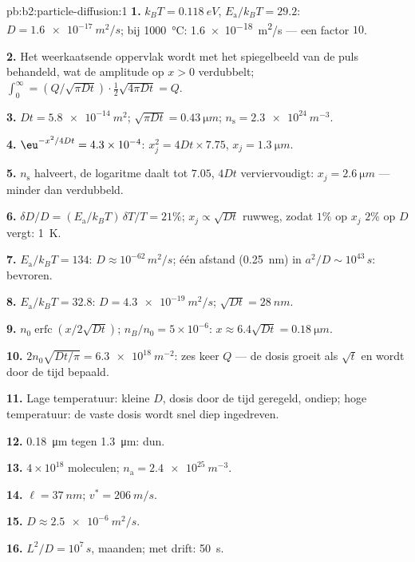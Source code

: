 \begin{solution}{pb:b2:particle-diffusion:1}
\textbf{1.} $k_BT = \qty{0.118}{eV}$, $E_{\text{a}}/k_BT = 29.2$:
$D =
\qty{1.6e-17}{m^2/s}$; bij \qty{1000}{\celsius}: \qty{1.6e-18}{m^2/s}
--- een
factor $10$.

\textbf{2.} Het weerkaatsende oppervlak wordt met het spiegelbeeld van de
puls behandeld, wat de amplitude op $x > 0$ verdubbelt;
$\int_0^\infty = (Q/\sqrt{\pi Dt})
\cdot \tfrac12\sqrt{4\pi Dt} = Q$.

\textbf{3.} $Dt = \qty{5.8e-14}{m^2}$;
$\sqrt{\pi Dt} = \qty{0.43}{\micro m}$;
$n_{\text{s}}
= \qty{2.3e24}{m^{-3}}$.

\textbf{4.} $\eu^{-x^2/4Dt} = 4.3 \times 10^{-4}$:
$x_j^2 = 4Dt \times 7.75$, $x_j =
\qty{1.3}{\micro m}$.

\textbf{5.} $n_{\text{s}}$ halveert, de logaritme daalt tot $7.05$, $4Dt$
verviervoudigt: $x_j = \qty{2.6}{\micro m}$ --- minder dan verdubbeld.

\textbf{6.} $\delta D/D = (E_{\text{a}}/k_BT)\,\delta T/T = 21\%$;
$x_j \propto
\sqrt{Dt}$ ruwweg, zodat $1\%$ op $x_j$ $2\%$ op $D$ vergt:
\qty{1}{K}.

\textbf{7.} $E_{\text{a}}/k_BT = 134$: $D \approx 10^{-62}\,\unit{m^2/s}$; één
afstand (\qty{0.25}{nm}) in $a^2/D \sim 10^{43}\,\unit{s}$: bevroren.

\textbf{8.} $E_{\text{a}}/k_BT = 32.8$: $D = \qty{4.3e-19}{m^2/s}$;
$\sqrt{Dt} =
\qty{28}{nm}$.

\textbf{9.} $n_0\operatorname{erfc}(x/2\sqrt{Dt})$; $n_B/n_0 = 5 \times 10^{-6}$:
$x \approx 6.4\sqrt{Dt} = \qty{0.18}{\micro m}$.

\textbf{10.} $2n_0\sqrt{Dt/\pi} = \qty{6.3e18}{m^{-2}}$: zes keer $Q$ ---
de dosis groeit als $\sqrt t$ en wordt door de tijd bepaald.

\textbf{11.} Lage temperatuur: kleine $D$, dosis door de tijd geregeld,
ondiep; hoge temperatuur: de vaste dosis wordt snel diep ingedreven.

\textbf{12.} \qty{0.18}{\micro m} tegen \qty{1.3}{\micro m}: dun.

\textbf{13.} $4 \times 10^{18}$ moleculen; $n_{\text{a}} = \qty{2.4e25}{m^{-3}}$.

\textbf{14.} $\ell = \qty{37}{nm}$; $v^* = \qty{206}{m/s}$.

\textbf{15.} $D \approx \qty{2.5e-6}{m^2/s}$.

\textbf{16.} $L^2/D = 10^7\,\unit{s}$, maanden; met drift: \qty{50}{s}.


\end{solution}
